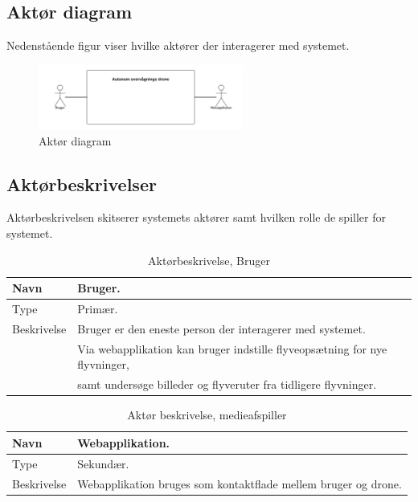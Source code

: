\subsection{Aktør diagram}
Nedenstående figur viser hvilke aktører der interagerer med systemet.

\begin{figure}[H]
\centering
\includegraphics[width=0.6\textwidth]{Billeder/Aktor_diagram.png}
\caption{Aktør diagram}
\label{fig:ATD}
\end{figure}

\subsection{Aktørbeskrivelser}
Aktørbeskrivelsen skitserer systemets aktører samt hvilken rolle de spiller for systemet.


\begin{table}[H]
\begin{tabular}{|l|p{13.25cm}|} \hline

Navn					& Bruger. 	\\\hline
Type					& Primær.	\\\hline
Beskrivelse				& Bruger er den eneste person der interagerer med systemet.\\
						& Via webapplikation kan bruger indstille flyveopsætning for nye flyvninger, \\ 
						& samt undersøge billeder og flyveruter fra tidligere flyvninger.\\\hline
						
\end{tabular}
\caption{Aktørbeskrivelse, Bruger}
\label{tab:AB1}
\end{table}


\begin{table}[H]
\begin{tabular}{|l|p{13.25cm}|}
\hline
Navn					& Webapplikation. 	\\\hline
Type					& Sekundær.	\\\hline
Beskrivelse				& Webapplikation bruges som kontaktflade mellem bruger og drone.\\\hline

\end{tabular}
\caption{Aktør beskrivelse, medieafspiller}
\label{tab:AB2}
\end{table}